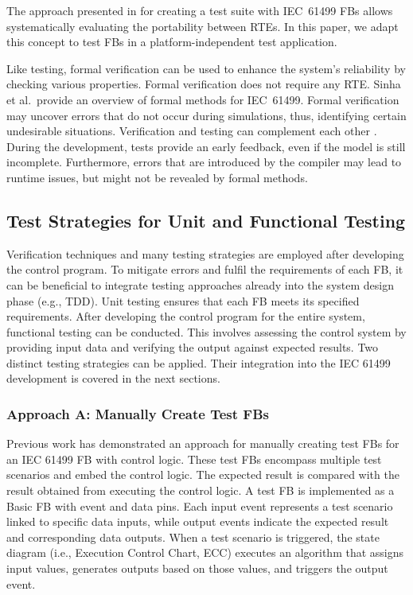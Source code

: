 \begin{bibunit}
The approach presented in \cite{Testing_Midhun} for creating a test suite with IEC~61499 FBs allows systematically evaluating the portability between RTEs. In this paper, we adapt this concept to test FBs in a platform-independent test application. 

Like testing, formal verification can be used to enhance the system's reliability by checking various properties. Formal verification does not require any RTE. Sinha et al.\,\cite{Sinha.2019} provide an overview of formal methods for IEC~61499. Formal verification may uncover errors that do not occur during simulations, thus, identifying certain undesirable situations. 
Verification and testing can complement each other \cite{Hussain.2006}. During the development, tests provide an early feedback, even if the model is still incomplete. Furthermore, errors that are introduced by the compiler may lead to runtime issues, but might not be revealed by formal methods. 

\subsection{Test Strategies for Unit and Functional Testing}
Verification techniques and many testing strategies are employed after developing the control program. To mitigate errors and fulfil the requirements of each FB, it can be beneficial to integrate testing approaches already into the system design phase (e.g., TDD). Unit testing ensures that each FB meets its specified requirements. After developing the control program for the entire system, functional testing can be conducted. This involves assessing the control system by providing input data and verifying the output against expected results.
Two distinct testing strategies can be applied. Their integration into the IEC 61499 development is covered in the next sections. 

\subsubsection{Approach A: Manually Create Test FBs}
Previous work has demonstrated an approach for manually creating test FBs \cite{Testing_Midhun} for an IEC 61499 FB with control logic. These test FBs encompass multiple test scenarios and embed the control logic. The expected result is compared with the result obtained from executing the control logic. A test FB is implemented as a Basic FB with event and data pins. Each input event represents a test scenario linked to specific data inputs, while output events indicate the expected result and corresponding data outputs. When a test scenario is triggered, the state diagram (i.e., Execution Control Chart, ECC) executes an algorithm that assigns input values, generates outputs based on those values, and triggers the output event.


\end{bibunit}
